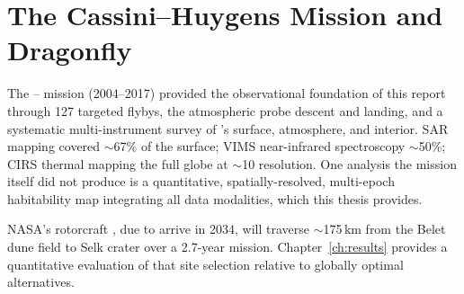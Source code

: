 \chapter{The Cassini--Huygens Mission and Dragonfly}
\label{app:missions}

The \cassini{}--\huygens{} mission (2004--2017) provided the observational foundation of this report through 127 targeted \titan{} flybys, the \huygens{} atmospheric probe descent and landing, and a systematic multi-instrument survey of \titan{}'s surface, atmosphere, and interior.  SAR mapping covered $\sim$67\% of the surface; VIMS near-infrared spectroscopy $\sim$50\%; CIRS thermal mapping the full globe at $\sim$10\textdegree{} resolution.  One analysis the mission itself did not produce is a quantitative, spatially-resolved, multi-epoch habitability map integrating all data modalities, which this thesis provides.

NASA's \dragonfly{} rotorcraft \citep{Lorenz2018Dragonfly}, due to arrive in 2034, will traverse $\sim$175\,km from the Belet dune field to Selk crater over a 2.7-year mission.  Chapter~\ref{ch:results} provides a quantitative evaluation of that site selection relative to globally optimal alternatives.